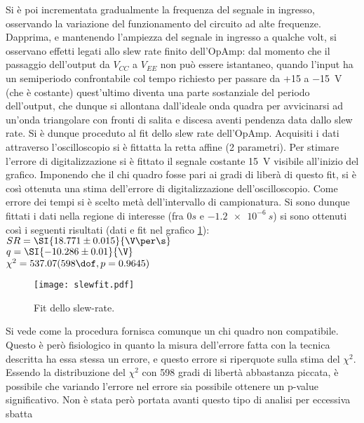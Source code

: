 Si è poi incrementata gradualmente la frequenza del segnale in ingresso, osservando la variazione del funzionamento del circuito ad alte frequenze.
Dapprima, e mantenendo l'ampiezza del segnale in ingresso a qualche volt, si osservano effetti legati allo slew rate finito dell'OpAmp: dal momento che il passaggio dell'output da $V_{CC}$ a $V_{EE}$ non può essere istantaneo, quando l'input ha un semiperiodo confrontabile col tempo richiesto per passare da +15 a \SI{-15}{\V} (che è costante) quest'ultimo diventa una parte sostanziale del periodo dell'output, che dunque si allontana dall'ideale onda quadra per avvicinarsi ad un'onda triangolare con fronti di salita e discesa aventi pendenza data dallo slew rate.
Si è dunque proceduto al fit dello slew rate dell'OpAmp. Acquisiti i dati attraverso l'oscilloscopio si è fittatta la retta affine (2 parametri). Per stimare l'errore di digitalizzazione si è fittato il segnale costante \SI{15}{\V} visibile all'inizio del grafico. Imponendo che il chi quadro fosse pari ai gradi di liberà di questo fit, si è così ottenuta una stima dell'errore di digitalizzazione dell'oscilloscopio. Come errore dei tempi si è scelto metà dell'intervallo di campionatura. Si sono dunque fittati i dati nella regione di interesse (fra $0 s$ e $\SI{-1.2e-6}{s}$) si sono ottenuti così i seguenti risultati	(dati e fit nel grafico \ref{f:SLW}):\\
$SR = \SI{18.771 \pm 0.015}{\V\per\s}$\\
$q = \SI{-10.286 \pm 0.01}{\V}$\\
$\chi^2 = 537.07 (598 \dof, p = 0.9645)$\\

\begin{figure}[h]
	\centering
	\texttt{[image: slewfit.pdf]}
	\caption{Fit dello slew-rate.}
	\label{f:SLW}
\end{figure}
Si vede come la procedura fornisca comunque un chi quadro non compatibile. Questo è però fisiologico in quanto la misura dell'errore fatta con la tecnica descritta ha essa stessa un errore, e questo errore si riperquote sulla stima del $\chi^2$. Essendo la distribuzione del $\chi^2$ con 598 gradi di libertà abbastanza piccata, è possibile che variando l'errore nel errore sia possibile ottenere un p-value significativo. Non è stata però portata avanti questo tipo di analisi per eccessiva sbatta %



